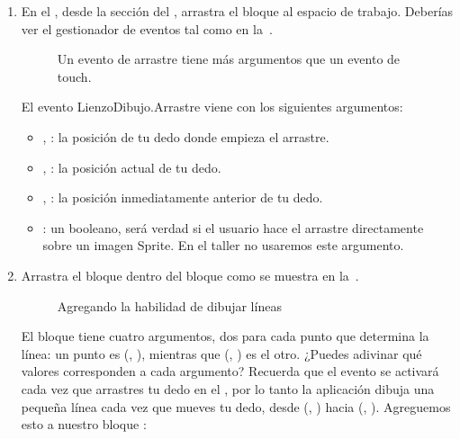 \begin{enumerate}
	
\item En el \blockEditor, desde la sección del
  , arrastra el bloque
   al espacio de trabajo. Deberías
  ver el gestionador de eventos tal como en la~.

\begin{figure}[H]
\centering
\caption{Un evento de arrastre tiene más argumentos que un evento de touch.}
\label{fig:PaintPot10}
\end{figure}

El evento LienzoDibujo.Arrastre viene con los siguientes argumentos:

\begin{itemize}

\item {}, : la posición de tu
  dedo donde empieza el arrastre.

\item {}, : la posición actual de
  tu dedo.

\item {}, : la posición
  inmediatamente anterior de tu dedo.

\item {}: un booleano, será verdad si el
  usuario hace el arrastre directamente sobre un imagen Sprite. En el
  taller no usaremos este argumento.

\end{itemize}

\item Arrastra el bloque  dentro
  del bloque  como se muestra en
  la~.

\begin{figure}[H]
\centering
\caption{Agregando la habilidad de dibujar líneas}
\label{fig:PaintPot11}
\end{figure}

El bloque  tiene cuatro argumentos,
dos para cada punto que determina la línea: un punto es
(, ), mientras que
(, ) es el otro. ¿Puedes adivinar qué
valores corresponden a cada argumento?  Recuerda que el evento
 se activará cada vez que arrastres
tu dedo en el \viewer, por lo tanto la aplicación dibuja una pequeña
línea cada vez que mueves tu dedo, desde
(, ) hacia
(, ). Agreguemos esto a nuestro
bloque :


\end{enumerate}

